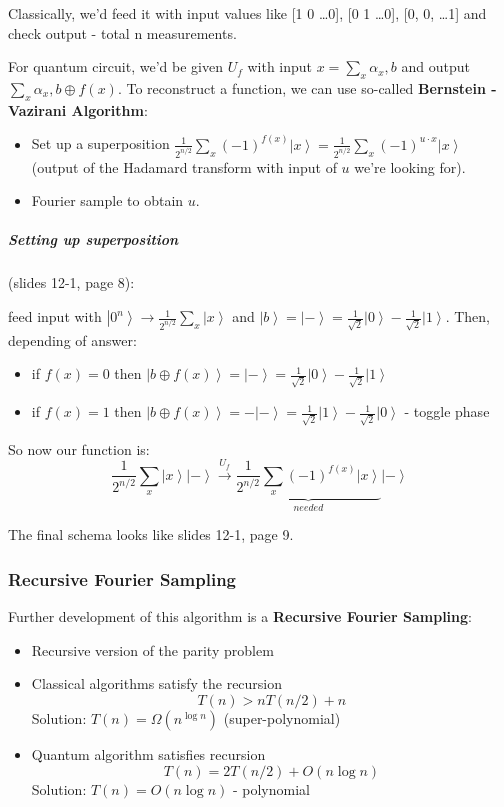 \documentclass{scrartcl}
\newcommand{\ket}[1]{\left| #1 \right>} %
\newcommand{\hqrt}{\frac1{\sqrt2}} %
\begin{document}
Classically, we'd feed it with input values like [1 0 \dots 0], [0 1 \dots 0],
[0, 0, \dots 1] and check output - total n measurements.

For quantum circuit, we'd be given $U_f$ with input $x = \sum \limits_x
\alpha_x, b$ and output $\sum \limits_x \alpha_x, b \oplus f(x)$. To reconstruct
a function, we can use so-called {\bf Bernstein - Vazirani Algorithm}:
\begin{itemize}
\item Set up a superposition $\frac1{2^{n/2}} \sum \limits_x (-1)^{f(x)} \ket x
  = \frac1{2^{n/2}} \sum \limits_x (-1)^{u \cdot x} \ket x$ (output of the
  Hadamard transform with input of $u$ we're looking for).
\item Fourier sample to obtain $u$.
\end{itemize}

\subparagraph{Setting up superposition}(slides 12-1, page 8):

feed input with $\ket{0^n} \to \frac1{2^{n/2}} \sum \limits_x \ket x$ and $\ket
b = \ket- = \hqrt \ket0 - \hqrt \ket1 $. Then, depending of answer:
\begin{itemize}
\item if $f(x) = 0$ then $\ket{b \oplus f(x)} = \ket- = \hqrt \ket0 - \hqrt
  \ket1$
\item if $f(x) = 1$ then $\ket{b \oplus f(x)} = - \ket- = \hqrt \ket1 - \hqrt
  \ket0$ - toggle phase
\end{itemize}
So now our function is:
$$ \frac1{2^{n/2}} \sum \limits_x \ket x \ket- \stackrel{U_f}{\longrightarrow}
\underbrace{\frac1{2^{n/2}} \sum \limits_x (-1)^{f(x)} \ket x}_{needed} \ket-$$

The final schema looks like slides 12-1, page 9.

\subsubsection{Recursive Fourier Sampling}
\label{sec:RecursiveSampling}

Further development of this algorithm is a {\bf Recursive Fourier Sampling}:
\begin{itemize}
\item Recursive version of the parity problem
\item Classical algorithms satisfy the recursion
$$T(n) > nT(n/2) + n$$
Solution: $T(n) = \Omega(n^{\log n})$ (super-polynomial)
\item Quantum algorithm satisfies recursion
$$T(n) = 2T(n/2) + O(n \log n)$$
Solution: $T(n) = O(n \log n)$ - polynomial
\end{itemize}
\end{document}
